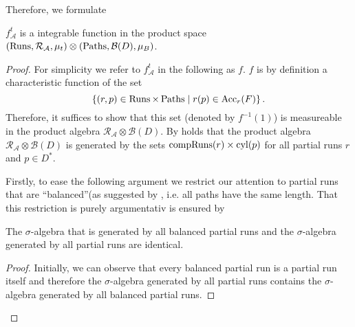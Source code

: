 Therefore, we formulate
\begin{proposition}
  \cite[Lemma 36]{RandAutoInfTrees}
  $f_{\mathcal{A}}^{t}$ is a integrable function in the product space
  $\left(\operatorname{Runs}, \mathcal{R}_{\mathcal{A}},\mu_{t}\right)\otimes
    \left(\operatorname{Paths}, \mathcal{B}(D), \mu_{B}\right)$.
\end{proposition}
\begin{proof}
  For simplicity we refer to $f_{\mathcal{A}}^{t}$ in the following as $f$.
  $f$ is by definition a characteristic function of the set
  \begin{equation*}
    \left\{\left(r,p\right)\in\operatorname{Runs}\times\operatorname{Paths}\mid r(p)\in\operatorname{Acc}_{r}(F)\right\}.
  \end{equation*}
  Therefore, it suffices to show that this set (denoted by $f^{-1}(1)$) is 
  measureable in the product algebra 
  $\mathcal{R}_{\mathcal{A}}\otimes\mathcal{B}(D)$. By 
  \cite[Theorem 22.1]{Bauer} holds that the product algebra
  $\mathcal{R}_{\mathcal{A}}\otimes\mathcal{B}(D)$ is generated by the
  sets $\operatorname{compRuns}(r)\times\operatorname{cyl}(p)$ for all partial runs $r$ and $p\in D^{*}$.

  Firstly, to ease the following argument we restrict our attention to
  partial runs that are \enquote{balanced}(as suggested by
  \cite[Remark 35]{RandAutoInfTrees}, i.e. all paths have the same length.
  That this restriction is purely argumentativ is ensured by
  \begin{lemma}
    The $\sigma$-algebra that is generated by all balanced partial runs and the 
    $\sigma$-algebra generated by all partial runs are identical.
  \end{lemma}
  \begin{proof}
    Initially, we can observe that every balanced partial run is a partial run
    itself and therefore the $\sigma$-algebra generated by all partial runs 
    contains the $\sigma$-algebra generated by all balanced partial runs.


\end{proof}
\end{proof}
